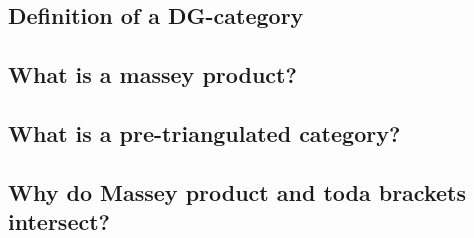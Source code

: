 \subsection{Definition of a DG-category}


\subsection{What is a massey product?}


\subsection{What is a pre-triangulated category?}


\subsection{Why do Massey product and toda brackets intersect?}

